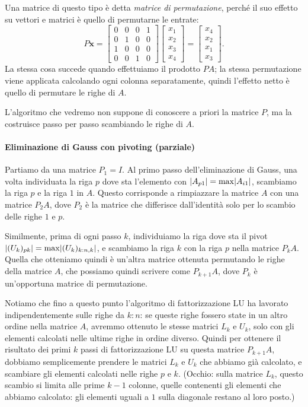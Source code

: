 \documentclass[a4paper]{report}
\DeclarePairedDelimiter{\abs}{\lvert}{\rvert}
\theoremstyle{definiton}
\theoremstyle{remark}
\newcommand{\x}{\mathbf{x}}
\begin{document}
Una matrice di questo tipo è detta \emph{matrice di permutazione}, perché il suo effetto su vettori e matrici è quello di permutarne le entrate:
\[
P\mathbf{x}
=
\begin{bmatrix}
    0 & 0 & 0 & 1\\
    0 & 1 & 0 & 0\\
    1 & 0 & 0 & 0\\
    0 & 0 & 1 & 0
\end{bmatrix}
\begin{bmatrix}
    x_1\\x_2\\x_3\\x_4
\end{bmatrix} = \begin{bmatrix}
    x_4\\x_2\\x_1\\x_3
\end{bmatrix}.
\]
La stessa cosa succede quando effettuiamo il prodotto $PA$; la stessa permutazione viene applicata calcolando ogni colonna separatamente, quindi l'effetto netto è quello di permutare le righe di $A$.

L'algoritmo che vedremo non suppone di conoscere a priori la matrice $P$, ma la costruisce passo per passo scambiando le righe di $A$.

\paragraph{Eliminazione di Gauss con pivoting (parziale)}

Partiamo da una matrice $P_1 = I$. Al primo passo dell'eliminazione di Gauss, una volta individuata la riga $p$ dove sta l'elemento con $\abs{A_{p1}} = \max \abs{A_{i1}}$, scambiamo la riga $p$ e la riga $1$ in $A$. Questo corrisponde a rimpiazzare la matrice $A$ con una matrice $P_2A$, dove $P_2$ è la matrice che differisce dall'identità solo per lo scambio delle righe $1$ e $p$.

Similmente, prima di ogni passo $k$, individuiamo la riga dove sta il pivot $\abs{(U_k)_{pk}} = \max \abs{(U_k)_{k:n,k}}$, e scambiamo la riga $k$ con la riga $p$ nella matrice $P_k A$. Quella che otteniamo quindi è un'altra matrice ottenuta permutando le righe della matrice $A$, che possiamo quindi scrivere come $P_{k+1} A$, dove $P_k$ è un'opportuna matrice di permutazione.

Notiamo che fino a questo punto l'algoritmo di fattorizzazione LU ha lavorato indipendentemente sulle righe da $k:n$: se queste righe fossero state in un altro ordine nella matrice $A$, avremmo ottenuto le stesse matrici $L_k$ e $U_k$, solo con gli elementi calcolati nelle ultime righe in ordine diverso. Quindi per ottenere il risultato dei primi $k$ passi di fattorizzazione LU su questa matrice $P_{k+1} A$, dobbiamo semplicemente prendere le matrici $L_k$ e $U_k$ che abbiamo già calcolato, e scambiare gli elementi calcolati nelle righe $p$ e $k$. (Occhio: sulla matrice $L_k$, questo scambio si limita alle prime $k-1$ colonne, quelle contenenti gli elementi che abbiamo calcolato: gli elementi uguali a $1$ sulla diagonale restano al loro posto.)
\end{document}
